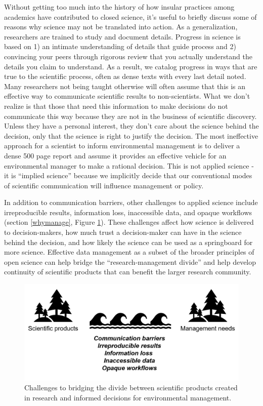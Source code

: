 \documentclass[
]{book}
\begin{document}
Without getting too much into the history of how insular practices among academics have contributed to closed science, it's useful to briefly discuss some of reasons why science may not be translated into action. As a generalization, researchers are trained to study and document details. Progress in science is based on 1) an intimate understanding of details that guide process and 2) convincing your peers through rigorous review that you actually understand the details you claim to understand. As a result, we catalog progress in ways that are true to the scientific process, often as dense texts with every last detail noted. Many researchers not being taught otherwise will often assume that this is an effective way to communicate scientific results to non-scientists. What we don't realize is that those that need this information to make decisions do not communicate this way because they are not in the business of scientific discovery. Unless they have a personal interest, they don't care about the science behind the decision, only that the science is right to justify the decision. The most ineffective approach for a scientist to inform environmental management is to deliver a dense 500 page report and assume it provides an effective vehicle for an environmental manager to make a rational decision. This is not applied science - it is ``implied science'' because we implicitly decide that our conventional modes of scientific communication will influence management or policy.

In addition to communication barriers, other challenges to applied science include irreproducible results, information loss, inaccessible data, and opaque workflows (section \ref{whymanage}, Figure \ref{fig:divide}). These challenges affect how science is delivered to decision-makers, how much trust a decision-maker can have in the science behind the decision, and how likely the science can be used as a springboard for more science. Effective data management as a subset of the broader principles of open science can help bridge the ``research-management divide'' and help develop continuity of scientific products that can benefit the larger research community.

\begin{figure}

{\centering \includegraphics[width=0.8\linewidth]{img/divide2} 

}

\caption{Challenges to bridging the divide between scientific products created in research and informed decisions for environmental management.}\label{fig:divide}
\end{figure}
\end{document}

